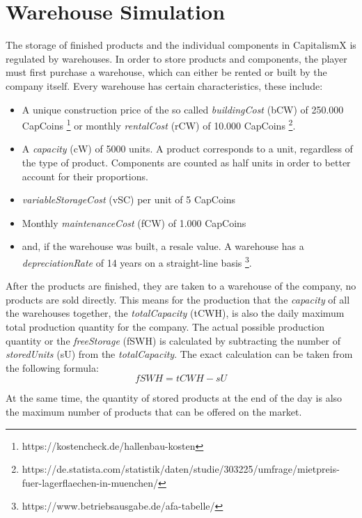 \section{Warehouse Simulation} \label{warehouse_simulation}

The storage of finished products and the individual components in CapitalismX is regulated by warehouses. In order to store products and components, the player must first purchase a warehouse, which can either be rented or built by the company itself. Every warehouse has certain characteristics, these include:
\begin{itemize}
    \item A unique construction price of the so called \textit{buildingCost} (\gls{bCW}) of 250.000 CapCoins  \footnote{https://kostencheck.de/hallenbau-kosten} or monthly \textit{rentalCost} (\gls{rCW}) of 10.000 CapCoins \footnote{https://de.statista.com/statistik/daten/studie/303225/umfrage/mietpreis-fuer-lagerflaechen-in-muenchen/}.
    \item A \textit{capacity} (\gls{cW}) of 5000 units. A product corresponds to a unit, regardless of the type of product. Components are counted as half units in order to better account for their proportions. 
    \item \textit{variableStorageCost} (\gls{vSC}) per unit of 5 CapCoins
    \item Monthly \textit{maintenanceCost} (\gls{fCW}) of 1.000 CapCoins
    \item and, if the warehouse was built, a resale value. A warehouse has a \textit{depreciationRate} of 14 years on a straight-line basis \footnote{https://www.betriebsausgabe.de/afa-tabelle/}.
\end{itemize}

After the products are finished, they are taken to a warehouse of the company, no products are sold directly. This means for the production that the \textit{capacity} of all the warehouses together, the \textit{totalCapacity} (\gls{tCWH}), is also the daily maximum total production quantity for the company. The actual possible production quantity or the \textit{freeStorage} (\gls{fSWH}) is calculated by subtracting the number of \textit{storedUnits} (\gls{sU}) from the \textit{totalCapacity}. The exact calculation can be taken from the following formula: 
\begin{equation}
    fSWH = tCWH - sU
\end{equation}

At the same time, the quantity of stored products at the end of the day is also the maximum number of products that can be offered on the market. 

